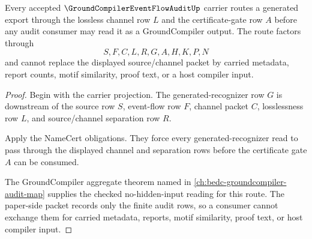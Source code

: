 \begin{theorem}
\label{thm:groundcompiler-eventflow-audit-lossless-gate}
Every accepted $\GroundCompilerEventFlowAuditUp$ carrier routes a generated export through the lossless channel row $L$ and the certificate-gate row $A$ before any audit consumer may read it as a GroundCompiler output. The route factors through
$$
S,F,C,L,R,G,A,H,K,P,N
$$
and cannot replace the displayed source/channel packet by carried metadata, report counts, motif similarity, proof text, or a host compiler input.
\end{theorem}
\begin{proof}
Begin with the carrier projection. The generated-recognizer row $G$ is downstream of the source row $S$, event-flow row $F$, channel packet $C$, losslessness row $L$, and source/channel separation row $R$.

Apply the NameCert obligations. They force every generated-recognizer read to pass through the displayed channel and separation rows before the certificate gate $A$ can be consumed.

The GroundCompiler aggregate theorem named in \autoref{ch:bedc-groundcompiler-audit-map} supplies the checked no-hidden-input reading for this route. The paper-side packet records only the finite audit rows, so a consumer cannot exchange them for carried metadata, reports, motif similarity, proof text, or host compiler input.
\end{proof}

